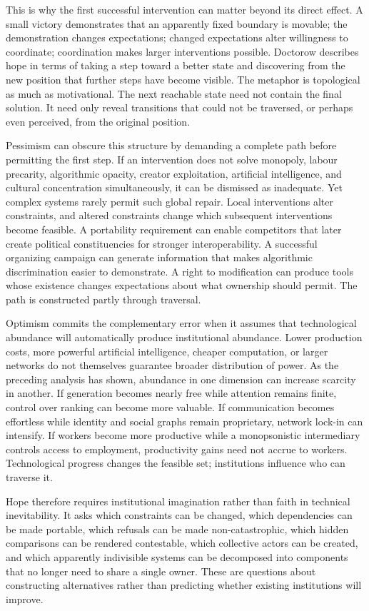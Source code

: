 \documentclass[11pt]{article}
\begin{document}
This is why the first successful intervention can matter beyond its direct effect. A small victory demonstrates that an apparently fixed boundary is movable; the demonstration changes expectations; changed expectations alter willingness to coordinate; coordination makes larger interventions possible. Doctorow describes hope in terms of taking a step toward a better state and discovering from the new position that further steps have become visible. The metaphor is topological as much as motivational. The next reachable state need not contain the final solution. It need only reveal transitions that could not be traversed, or perhaps even perceived, from the original position.

Pessimism can obscure this structure by demanding a complete path before permitting the first step. If an intervention does not solve monopoly, labour precarity, algorithmic opacity, creator exploitation, artificial intelligence, and cultural concentration simultaneously, it can be dismissed as inadequate. Yet complex systems rarely permit such global repair. Local interventions alter constraints, and altered constraints change which subsequent interventions become feasible. A portability requirement can enable competitors that later create political constituencies for stronger interoperability. A successful organizing campaign can generate information that makes algorithmic discrimination easier to demonstrate. A right to modification can produce tools whose existence changes expectations about what ownership should permit. The path is constructed partly through traversal.

Optimism commits the complementary error when it assumes that technological abundance will automatically produce institutional abundance. Lower production costs, more powerful artificial intelligence, cheaper computation, or larger networks do not themselves guarantee broader distribution of power. As the preceding analysis has shown, abundance in one dimension can increase scarcity in another. If generation becomes nearly free while attention remains finite, control over ranking can become more valuable. If communication becomes effortless while identity and social graphs remain proprietary, network lock-in can intensify. If workers become more productive while a monopsonistic intermediary controls access to employment, productivity gains need not accrue to workers. Technological progress changes the feasible set; institutions influence who can traverse it.

Hope therefore requires institutional imagination rather than faith in technical inevitability. It asks which constraints can be changed, which dependencies can be made portable, which refusals can be made non-catastrophic, which hidden comparisons can be rendered contestable, which collective actors can be created, and which apparently indivisible systems can be decomposed into components that no longer need to share a single owner. These are questions about constructing alternatives rather than predicting whether existing institutions will improve.
\end{document}
